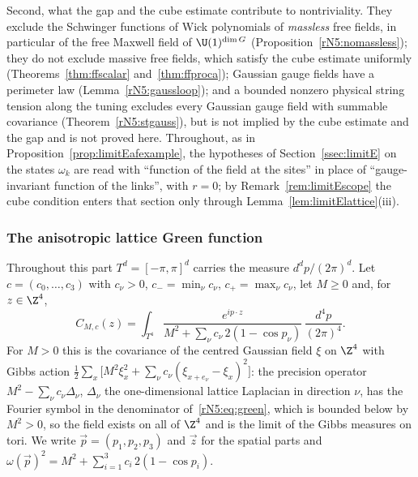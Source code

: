 Second, what the gap and the cube estimate contribute to nontriviality. They
exclude the Schwinger functions of Wick polynomials of \emph{massless} free
fields, in particular of the free Maxwell field of $\U(1)^{\dim G}$
(Proposition~\ref{rN5:nomassless}); they do not exclude massive free
fields, which satisfy the cube estimate uniformly
(Theorems~\ref{thm:ffscalar} and~\ref{thm:ffproca}); Gaussian gauge
fields have a perimeter law (Lemma~\ref{rN5:gaussloop}); and a bounded
nonzero physical string tension along the tuning excludes every Gaussian
gauge field with summable covariance (Theorem~\ref{rN5:stgauss}), but is
not implied by the cube estimate and the gap and is not proved here.
Throughout, as in Proposition~\ref{prop:limitEafexample}, the hypotheses of
Section~\ref{ssec:limitE} on the states $\omega_k$ are read with
``function of the field at the sites'' in place of ``gauge-invariant
function of the links'', with $r=0$; by Remark~\ref{rem:limitEscope} the
cube condition enters that section only through
Lemma~\ref{lem:limitElattice}(iii).

\subsubsection{The anisotropic lattice Green function}

Throughout this part $T^d=[-\pi,\pi]^d$ carries the measure $d^dp/(2\pi)^d$.
Let $c=(c_0,\dots,c_3)$ with $c_\nu>0$, $c_-=\min_\nu c_\nu$, $c_+=\max_\nu
c_\nu$, let $M\ge0$ and, for $z\in\Z^4$,
\begin{equation}\label{rN5:eq:green}
C_{M,c}(z)=\int_{T^4}\frac{e^{ip\cdot z}}{M^2+\sum_\nu c_\nu\,2(1-\cos
p_\nu)}\,\frac{d^4p}{(2\pi)^4}.
\end{equation}
For $M>0$ this is the covariance of the centred Gaussian field $\xi$ on
$\Z^4$ with Gibbs action $\frac12\sum_x\bigl[M^2\xi_x^2+\sum_\nu c_\nu(\xi_{x+e_\nu}
-\xi_x)^2\bigr]$: the precision operator $M^2-\sum_\nu c_\nu\Delta_\nu$,
$\Delta_\nu$ the one-dimensional lattice Laplacian in direction $\nu$, has
the Fourier symbol in the denominator of~\eqref{rN5:eq:green}, which is
bounded below by $M^2>0$, so the field exists on all of $\Z^4$ and is the
limit of the Gibbs measures on tori. We write $\vec p=(p_1,p_2,p_3)$ and
$\vec z$ for the spatial parts and $\omega(\vec p)^2=M^2+\sum_{i=1}^3c_i\,2(1-\cos p_i)$.


